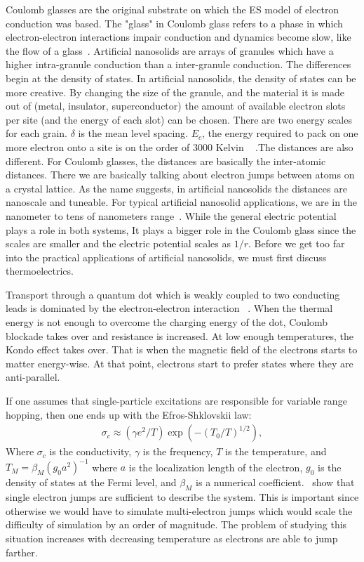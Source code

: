 Coulomb glasses are the original substrate on which the ES model of electron conduction was based. The "glass" in Coulomb glass refers to a phase in which electron-electron interactions impair conduction and dynamics become slow, like the flow of a glass~\cite{ortuno04}. Artificial nanosolids are arrays of granules which have a higher intra-granule conduction than a inter-granule conduction. The differences begin at the density of states. In artificial nanosolids, the density of states can be more creative. By changing the size of the granule, and the material it is made out of (metal, insulator, superconductor) the amount of available electron slots per site (and the energy of each slot) can be chosen. There are two energy scales for each grain. $\delta$ is the mean level spacing. $E_c$, the energy required to pack on one more electron onto a site is on the order of 3000 Kelvin ~\cite{glatz08} .The distances are also different. For Coulomb glasses, the distances are basically the inter-atomic distances. There we are basically talking about electron jumps between atoms on a crystal lattice. As the name suggests, in artificial nanosolids the distances are nanoscale and tuneable. For typical artificial nanosolid applications, we are in the nanometer to tens of nanometers range~\cite{beloborodov05}. While the general electric potential plays a role in both systems, It plays a bigger role in the Coulomb glass since the scales are smaller and the electric potential scales as $1/r$. Before we get too far into the practical applications of artificial nanosolids, we must first discuss thermoelectrics.


Transport through a quantum dot which is weakly coupled to two conducting leads is dominated by the electron-electron interaction ~\cite{Glazman05}. When the thermal energy is not enough to overcome the charging energy of the dot, Coulomb blockade takes over and resistance is increased. At low enough temperatures, the Kondo effect takes over. That is when the magnetic field of the electrons starts to matter energy-wise. At that point, electrons start to prefer states where they are anti-parallel.

If one assumes that single-particle excitations are responsible for variable range hopping, then one ends up with the Efros-Shklovskii law:
\begin{eqnarray}
\sigma_c \approx (\gamma e^2 / T) \exp(-(T_0/T)^{1/2}),
\label{ESlaw }
\end{eqnarray}
Where $\sigma_c$ is the conductivity, $\gamma$ is the frequency, $T$ is the temperature, and $T_M = \beta_M (g_0 a^2)^{-1}$ where $a$ is the localization length of the electron, $g_0$ is the density of states at the Fermi level, and $\beta_M$ is a numerical coefficient.~\cite{Tsigankov02} show that single electron jumps are sufficient to describe the system. This is important since otherwise we would have to simulate multi-electron jumps which would scale the difficulty of simulation by an order of magnitude. The problem of studying this situation increases with decreasing temperature as electrons are able to jump farther.

